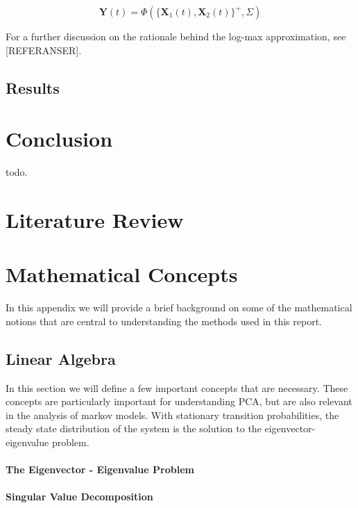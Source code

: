 \documentclass[11pt, oneside, a4paper]{report}
\begin{document}
\begin{equation}
  \mathbf{Y}(t) = \Phi(\{\mathbf{X}_1(t), \mathbf{X}_2(t)\}^{+}, \Sigma)
\end{equation}

For a further discussion on the rationale behind the log-max
approximation, see [REFERANSER].




\section{Results}



\chapter{Conclusion}

todo.

\appendix

\chapter{Literature Review}


\chapter{Mathematical Concepts}

In this appendix we will provide a brief background on some of the mathematical notions that are central to understanding the methods used in this report. 

\section{Linear Algebra}

In this section we will define a few important concepts that are
necessary. These concepts are particularly important for understanding
PCA, but are also relevant in the analysis of markov models. With
stationary transition probabilities, the steady state distribution of
the system is the solution to the eigenvector-eigenvalue problem.

\subsubsection{The Eigenvector - Eigenvalue Problem}

\subsubsection{Singular Value Decomposition}
\end{document}
